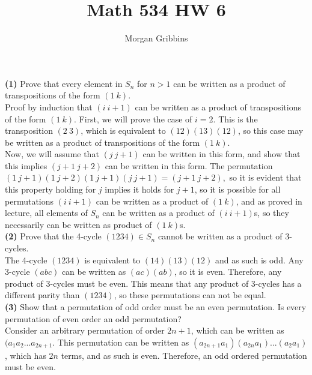 \documentclass[12pt,letterpaper]{article}
\title{Math 534 HW 6}
\author{Morgan Gribbins}
\date{}
\begin{document}
	
\maketitle

\textbf{(1)} Prove that every element in \(S_{n}\) for \(n > 1\) can be written as a product of transpositions of the form \((1\ k)\). \\

Proof by induction that \((i\ i+1)\) can be written as a product of transpositions of the form \((1\ k)\). First, we will prove the case of \(i = 2\). This is the transposition \((2\ 3)\), which is equivalent to \((12)(13)(12)\), so this case may be written as a product of transpositions of the form \((1\ k)\). \\

 Now, we will assume that \((j\ j+1)\) can be written in this form, and show that this implies \((j+1\ j+2)\) can be written in this form. The permutation \((1\ j+1)(1\ j+2)(1\ j+1)(j\ j+1) = (j+1\ j+2),\) so it is evident that this property holding for \(j\) implies it holds for \(j+1\), so it is possible for all permutations \((i\ i+1)\) can be written as a product of \((1\ k)\), and as proved in lecture, all elements of \(S_{n}\) can be written as a product of \((i\ i+1)\)s, so they necessarily can be written as product of \((1\ k)\)s. \\

\textbf{(2)} Prove that the 4-cycle \((1234) \in S_{n}\) cannot be written as a product of 3-cycles. \\

The 4-cycle \((1234)\) is equivalent to \((14)(13)(12)\) and as such is odd. Any 3-cycle \((abc)\) can be written as \((ac)(ab)\), so it is even. Therefore, any product of 3-cycles must be even. This means that any product of 3-cycles has a different parity than \((1234)\), so these permutations can not be equal. \\ 

\textbf{(3)} Show that a permutation of odd order must be an even permutation. Is every permutation of even order an odd permutation? \\

Consider an arbitrary permutation of order \(2n+1\), which can be written as  \((a_{1}a_{2}...a_{2n+1}\). This permutation can be written as \((a_{2n+1}a_{1})(a_{2n}a_{1})...(a_{2}a_{1})\), which has \(2n\) terms, and as such is even. Therefore, an odd ordered permutation must be even. \\
\end{document}
